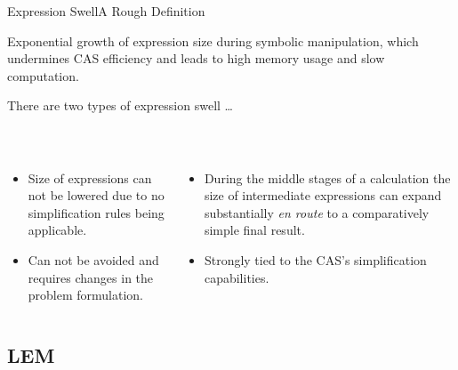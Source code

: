 \begin{frame}{Expression Swell}{A Rough Definition}
  \begin{bbox}
    Exponential growth of expression size during symbolic manipulation, which undermines \ac{CAS} efficiency and leads to high memory usage and slow computation.
  \end{bbox}
  \vspace{0.75em}
  There are two types of expression swell \dots
  \vspace{0.75em}
  \begin{columns}
    \begin{column}[t]{0.5\textwidth}
       \\
      \begin{itemize}\small
        \item Size of expressions can not be lowered due to no simplification rules being applicable.
        \item Can not be avoided and requires changes in the problem formulation.
      \end{itemize}
    \end{column}
    \begin{column}[t]{0.5\textwidth}
       \\
      \begin{itemize}\small
        \item During the middle stages of a calculation the size of intermediate expressions can expand substantially \emph{en route} to a comparatively simple final result.
        \item Strongly tied to the \ac{CAS}'s simplification capabilities.
      \end{itemize}
    \end{column}
  \end{columns}
\end{frame}

\subsection{\acl{LEM}}

